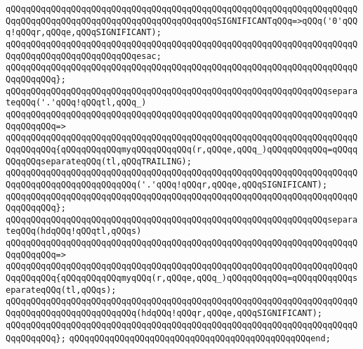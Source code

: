 \verb|qQQqqQQqqQQqqQQqqQQqqQQqqQQqqQQqqQQqqQQqqQQqqQQqqQQqqQQqqQQqqQQqqQQqqQQqqQQqqQQqqQQqqQQqqQQqqQQqqQQqqQQqqQQqqQQqSIGNIFICANTqQQq=>qQQq('0'qQQq!qQQqr,qQQqe,qQQqSIGNIFICANT);|\newline
\verb|qQQqqQQqqQQqqQQqqQQqqQQqqQQqqQQqqQQqqQQqqQQqqQQqqQQqqQQqqQQqqQQqqQQqqQQqqQQqqQQqqQQqqQQqqQQqqQQqesac;|\newline
\verb|qQQqqQQqqQQqqQQqqQQqqQQqqQQqqQQqqQQqqQQqqQQqqQQqqQQqqQQqqQQqqQQqqQQqqQQqqQQqqQQq};|\newline
\newline
\verb|qQQqqQQqqQQqqQQqqQQqqQQqqQQqqQQqqQQqqQQqqQQqqQQqqQQqqQQqqQQqqQQqseparateqQQq('.'qQQq!qQQqtl,qQQq_)|\newline
\verb|qQQqqQQqqQQqqQQqqQQqqQQqqQQqqQQqqQQqqQQqqQQqqQQqqQQqqQQqqQQqqQQqqQQqqQQqqQQqqQQq=>|\newline
\verb|qQQqqQQqqQQqqQQqqQQqqQQqqQQqqQQqqQQqqQQqqQQqqQQqqQQqqQQqqQQqqQQqqQQqqQQqqQQqqQQq{qQQqqQQqqQQqmyqQQqqQQqqQQq(r,qQQqe,qQQq_)qQQqqQQqqQQq=qQQqqQQqqQQqseparateqQQq(tl,qQQqTRAILING);|\newline
\newline
\verb|qQQqqQQqqQQqqQQqqQQqqQQqqQQqqQQqqQQqqQQqqQQqqQQqqQQqqQQqqQQqqQQqqQQqqQQqqQQqqQQqqQQqqQQqqQQqqQQq('.'qQQq!qQQqr,qQQqe,qQQqSIGNIFICANT);|\newline
\verb|qQQqqQQqqQQqqQQqqQQqqQQqqQQqqQQqqQQqqQQqqQQqqQQqqQQqqQQqqQQqqQQqqQQqqQQqqQQqqQQq};|\newline
\newline
\verb|qQQqqQQqqQQqqQQqqQQqqQQqqQQqqQQqqQQqqQQqqQQqqQQqqQQqqQQqqQQqqQQqseparateqQQq(hdqQQq!qQQqtl,qQQqs)|\newline
\verb|qQQqqQQqqQQqqQQqqQQqqQQqqQQqqQQqqQQqqQQqqQQqqQQqqQQqqQQqqQQqqQQqqQQqqQQqqQQqqQQq=>|\newline
\verb|qQQqqQQqqQQqqQQqqQQqqQQqqQQqqQQqqQQqqQQqqQQqqQQqqQQqqQQqqQQqqQQqqQQqqQQqqQQqqQQq{qQQqqQQqqQQqmyqQQq(r,qQQqe,qQQq_)qQQqqQQqqQQq=qQQqqQQqqQQqseparateqQQq(tl,qQQqs);|\newline
\newline
\verb|qQQqqQQqqQQqqQQqqQQqqQQqqQQqqQQqqQQqqQQqqQQqqQQqqQQqqQQqqQQqqQQqqQQqqQQqqQQqqQQqqQQqqQQqqQQqqQQq(hdqQQq!qQQqr,qQQqe,qQQqSIGNIFICANT);|\newline
\verb|qQQqqQQqqQQqqQQqqQQqqQQqqQQqqQQqqQQqqQQqqQQqqQQqqQQqqQQqqQQqqQQqqQQqqQQqqQQqqQQq};|\newline
\verb|qQQqqQQqqQQqqQQqqQQqqQQqqQQqqQQqqQQqqQQqqQQqqQQqend;|\newline
\newline
\newline
